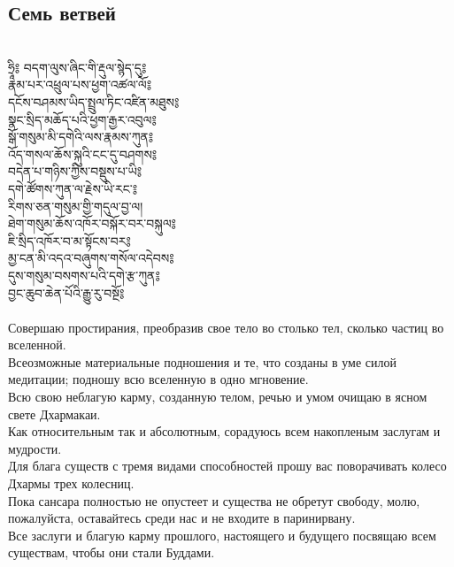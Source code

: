 \subsection{Семь ветвей}
\\
\ti
ཧྲཱི༔ བདག་ལུས་ཞིང་གི་རྡུལ་སྙེད་དུ༔\\
རྣམ་པར་འཕྲུལ་པས་ཕྱག་འཚལ་ལོ༔\\
དངོས་བཤམས་ཡིད་སྤྲུལ་ཏིང་འཛིན་མཐུས༔\\
སྣང་སྲིད་མཆོད་པའི་ཕྱག་རྒྱར་འབུལ༔\\
སྒོ་གསུམ་མི་དགེའི་ལས་རྣམས་ཀུན༔\\
འོད་གསལ་ཆོས་སྐུའི་ངང་དུ་བཤགས༔\\
བདེན་པ་གཉིས་ཀྱིས་བསྡུས་པ་ཡི༔\\
དགེ་ཚོགས་ཀུན་ལ་རྗེས་ཡི་རང་༔\\
རིགས་ཅན་གསུམ་གྱི་གདུལ་བྱ་ལ།\\
ཐེག་གསུམ་ཆོས་འཁོར་བསྐོར་བར་བསྐུལ༔\\
ཇི་སྲིད་འཁོར་བ་མ་སྟོངས་བར༔ \\
མྱ་ངན་མི་འདའ་བཞུགས་གསོལ་འདེབས༔ \\
དུས་གསུམ་བསགས་པའི་དགེ་རྩ་ཀུན༔ \\
བྱང་ཆུབ་ཆེན་པོའི་རྒྱུ་རུ་བསྔོ༔ \\
\\
\ru
Совершаю простирания, преобразив свое тело
во столько тел, сколько частиц во вселенной.\\
Всеозможные материальные подношения и те, что созданы в уме силой медитации;
подношу всю вселенную в одно мгновение.\\
Всю свою неблагую карму, созданную телом, речью и умом
очищаю в ясном свете Дхармакаи.\\
Как относительным так и абсолютным,
сорадуюсь всем накопленым заслугам и мудрости.\\
Для блага существ с тремя видами способностей
прошу вас  поворачивать колесо Дхармы трех колесниц.\\
Пока сансара полностью не опустеет и существа не обретут свободу,
молю, пожалуйста, оставайтесь среди нас и не входите в паринирвану.\\
Все заслуги и благую карму прошлого, настоящего и будущего
посвящаю всем существам, чтобы они стали Буддами.
\\
